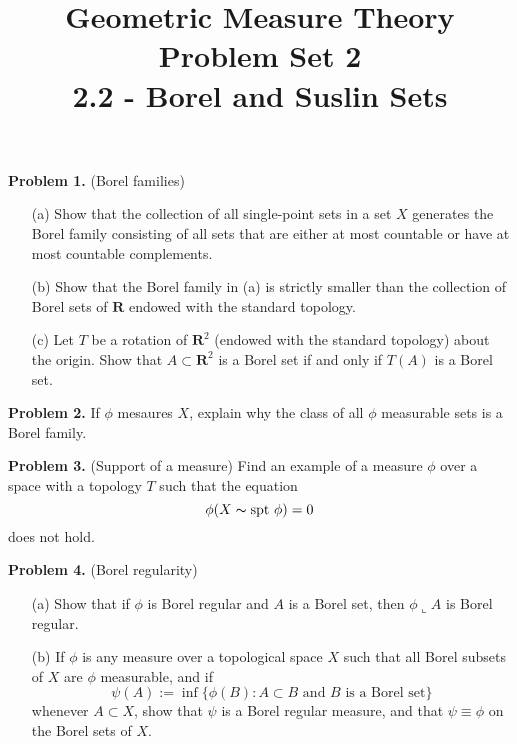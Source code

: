 \documentclass[10pt]{article}
\title{\selectfont\textbf{ Geometric Measure Theory} \\
	Problem Set 2 \\ \normalsize{2.2 - Borel and Suslin Sets}}
\date{}
\begin{document}
	\maketitle
	
	\noindent \textbf{Problem 1.} (Borel families)
		\begin{itemize}
			\item[(a)] Show that the collection of all single-point sets in a set $X$ generates the Borel family consisting of all sets that are either at most countable or have at most countable complements. 
			
			\item[(b)] Show that the Borel family in (a) is strictly smaller than the collection of Borel sets of $\mathbf{R}$ endowed with the standard topology.
			
			\item[(c)] Let $T$ be a rotation of $\mathbf{R}^2$ (endowed with the standard topology) about the origin. Show that $A \subset \mathbf{R}^2$ is a Borel set if and only if $T(A)$ is a Borel set.
		\end{itemize}
	
	\noindent \textbf{Problem 2.} If $\phi$ mesaures $X$, explain why the class of all $\phi$ measurable sets is a Borel family.
		
	
	\vspace{20pt}
	
	\noindent \textbf{Problem 3.} (Support of a measure) Find an example of a measure $\phi$ over a space with a topology $T$ such that the equation $$\phi(X \thicksim \text{spt }\phi) = 0$$ does not hold.  
	
	\vspace{20pt}
	
	\noindent \textbf{Problem 4.} (Borel regularity) ~
		\begin{itemize}
			\item[(a)] Show that if $\phi$ is Borel regular and $A$ is a Borel set, then $\phi \llcorner A$ is Borel regular. 
			
			\item[(b)] If $\phi$ is any measure over a topological space $X$ such that all Borel subsets of $X$ are $\phi$ measurable, and if $$\psi(A) := \inf \{ \phi(B) : A \subset B \text{ and } B \text{ is a Borel set}\}$$ whenever $A \subset X$, show that $\psi$ is a Borel regular measure, and that $\psi \equiv \phi$ on the Borel sets of $X$.  
		\end{itemize}
	
	\vspace{20pt}
	
\end{document}
